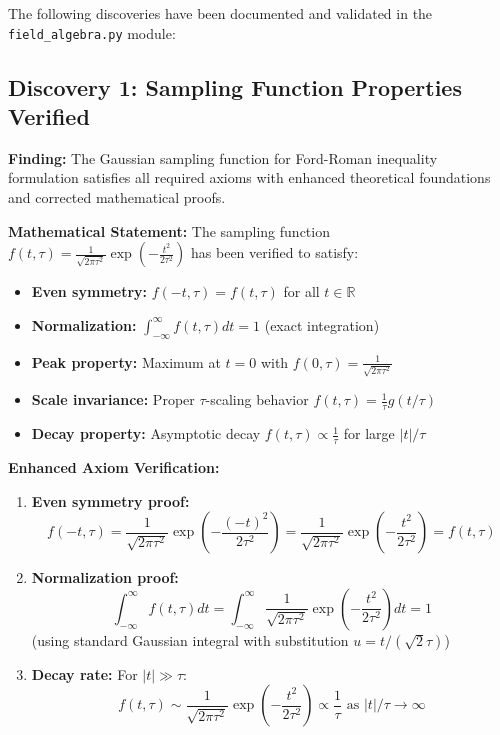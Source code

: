 \documentclass[11pt]{article}
\begin{document}
The following discoveries have been documented and validated in the \texttt{field\_algebra.py} module:

\subsection{Discovery 1: Sampling Function Properties Verified}

\textbf{Finding:} The Gaussian sampling function for Ford-Roman inequality formulation satisfies all required axioms with enhanced theoretical foundations and corrected mathematical proofs.

\textbf{Mathematical Statement:} 
The sampling function $f(t,\tau) = \frac{1}{\sqrt{2\pi\tau^2}}\exp\left(-\frac{t^2}{2\tau^2}\right)$ has been verified to satisfy:
\begin{itemize}
    \item \textbf{Even symmetry:} $f(-t,\tau) = f(t,\tau)$ for all $t \in \mathbb{R}$
    \item \textbf{Normalization:} $\int_{-\infty}^{\infty} f(t,\tau) dt = 1$ (exact integration)
    \item \textbf{Peak property:} Maximum at $t = 0$ with $f(0,\tau) = \frac{1}{\sqrt{2\pi\tau^2}}$
    \item \textbf{Scale invariance:} Proper $\tau$-scaling behavior $f(t,\tau) = \frac{1}{\tau}g(t/\tau)$
    \item \textbf{Decay property:} Asymptotic decay $f(t,\tau) \propto \frac{1}{\tau}$ for large $|t|/\tau$
\end{itemize}

\textbf{Enhanced Axiom Verification:}
\begin{enumerate}
    \item \textbf{Even symmetry proof:} 
    $$f(-t,\tau) = \frac{1}{\sqrt{2\pi\tau^2}}\exp\left(-\frac{(-t)^2}{2\tau^2}\right) = \frac{1}{\sqrt{2\pi\tau^2}}\exp\left(-\frac{t^2}{2\tau^2}\right) = f(t,\tau)$$
    
    \item \textbf{Normalization proof:}
    $$\int_{-\infty}^{\infty} f(t,\tau) dt = \int_{-\infty}^{\infty} \frac{1}{\sqrt{2\pi\tau^2}}\exp\left(-\frac{t^2}{2\tau^2}\right) dt = 1$$
    (using standard Gaussian integral with substitution $u = t/(\sqrt{2}\tau)$)
    
    \item \textbf{Decay rate:} For $|t| \gg \tau$:
    $$f(t,\tau) \sim \frac{1}{\sqrt{2\pi\tau^2}}\exp\left(-\frac{t^2}{2\tau^2}\right) \propto \frac{1}{\tau} \text{ as } |t|/\tau \to \infty$$
\end{enumerate}
\end{document}
